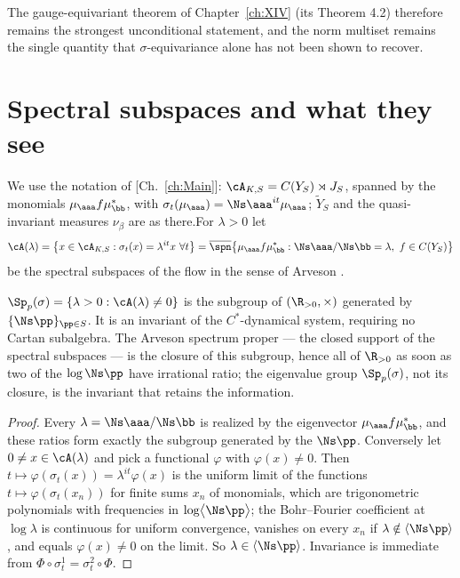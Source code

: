 \begin{summary}
The gauge-equivariant theorem of Chapter~\ref{ch:XIV} (its Theorem 4.2) therefore remains the strongest
unconditional statement, and the norm multiset remains the single quantity that
$\sigma$-equivariance alone has not been shown to recover.
\end{summary}


\section{Spectral subspaces and what they see}

We use the notation of [Ch.~\ref{ch:Main}]: $\cA_{K,S}=C(Y_S)\rtimes J_S$, spanned by the monomials
$\mu_\aaa f\mu_\bb^*$, with $\sigma_t(\mu_\aaa)=\Ns\aaa^{it}\mu_\aaa$; $\widetilde Y_S$ and
the quasi-invariant measures $\nu_\beta$ are as there.For $\lambda>0$ let
\[
\cA(\lambda)=\bigl\{x\in\cA_{K,S}:\sigma_t(x)=\lambda^{it}x\ \forall t\bigr\}
=\overline{\spn}\bigl\{\mu_\aaa f\mu_\bb^*:\Ns\aaa/\Ns\bb=\lambda,\ f\in C(Y_S)\bigr\}
\]
be the spectral subspaces of the flow in the sense of Arveson \cite{Arveson}.

\begin{proposition}\label{XV:prop:spectrum}
$\Sp_p(\sigma)=\{\lambda>0:\cA(\lambda)\ne0\}$ is the subgroup of $(\R_{>0},\times)$ generated
by $\{\Ns\pp\}_{\pp\in S}$. It is an invariant of the $C^*$-dynamical system, requiring no
Cartan subalgebra. The Arveson spectrum proper --- the closed support of the spectral
subspaces --- is the closure of this subgroup, hence all of $\R_{>0}$ as soon as two of the
$\log\Ns\pp$ have irrational ratio; the eigenvalue group $\Sp_p(\sigma)$, not its closure, is
the invariant that retains the information.
\end{proposition}

\begin{proof}
Every $\lambda=\Ns\aaa/\Ns\bb$ is realized by the eigenvector $\mu_\aaa f\mu_\bb^*$, and these
ratios form exactly the subgroup generated by the $\Ns\pp$. Conversely let
$0\ne x\in\cA(\lambda)$ and pick a functional $\varphi$ with $\varphi(x)\ne0$. Then
$t\mapsto\varphi(\sigma_t(x))=\lambda^{it}\varphi(x)$ is the uniform limit of the functions
$t\mapsto\varphi(\sigma_t(x_n))$ for finite sums $x_n$ of monomials, which are trigonometric
polynomials with frequencies in $\log\bigl\langle\Ns\pp\bigr\rangle$; the Bohr--Fourier
coefficient at $\log\lambda$ is continuous for uniform convergence, vanishes on every $x_n$
if $\lambda\notin\langle\Ns\pp\rangle$, and equals $\varphi(x)\ne0$ on the limit. So
$\lambda\in\langle\Ns\pp\rangle$. Invariance is immediate from
$\Phi\circ\sigma^1_t=\sigma^2_t\circ\Phi$.
\end{proof}

